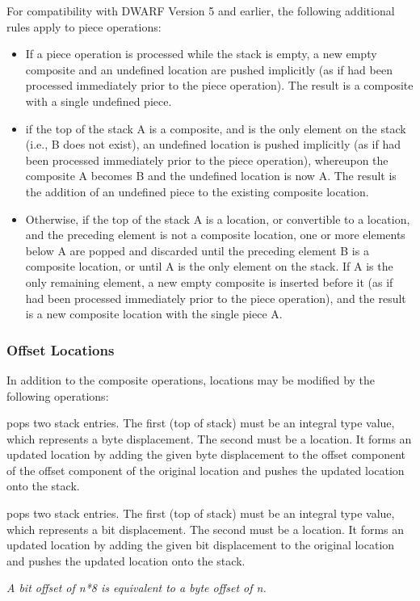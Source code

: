 For compatibility with DWARF Version 5 and earlier, the following
additional rules apply to piece operations:

\begin{itemize}
\item If a piece operation is processed while the stack is empty, a
new empty composite and an undefined location are pushed implicitly
(as if \DWOPcompositeNAME{} \DWOPundefinedNAME{} had been processed
immediately prior to the piece operation). The result is a composite
with a single undefined piece.

\item if the top of the stack A is a composite, and is the only
element on the stack (i.e., B does not exist), an undefined location
is pushed implicitly (as if\DWOPundefinedNAME{} had been processed
immediately prior to the piece operation), whereupon the composite A
becomes B and the undefined location is now A. The result is the
addition of an undefined piece to the existing composite location.

\item Otherwise, if the top of the stack A is a location, or
convertible to a location, and the preceding element is not a
composite location, one or more elements below A are popped and
discarded until the preceding element B is a composite location, or
until A is the only element on the stack. If A is the only remaining
element, a new empty composite is inserted before it (as if
\DWOPcompositeNAME{} \DWOPswapNAME{} had been processed immediately
prior to the piece operation), and the result is a new composite
location with the single piece A.
\end{itemize}

\subsubsection{Offset Locations}
\label{chap:offsetlocations}
In addition to the composite operations, locations may be modified by the following operations:

\begin{enumerate}[1. ]
\itembfnl{\DWOPoffsetTARG}
\DWOPoffsetNAME pops two stack entries. The first (top of stack) must
be an integral type value, which represents a byte displacement. The
second must be a location. It forms an updated location by adding the
given byte displacement to the offset component of the offset
component of the original location and pushes the updated location
onto the stack.

\itembfnl{\DWOPbitoffsetTARG}
\DWOPbitoffsetNAME pops two stack entries. The first (top of stack)
must be an integral type value, which represents a bit
displacement. The second must be a location. It forms an updated
location by adding the given bit displacement to the original location
and pushes the updated location onto the stack.

\textit{A bit offset of n*8 is equivalent to a byte offset of n.}
\end{enumerate}

